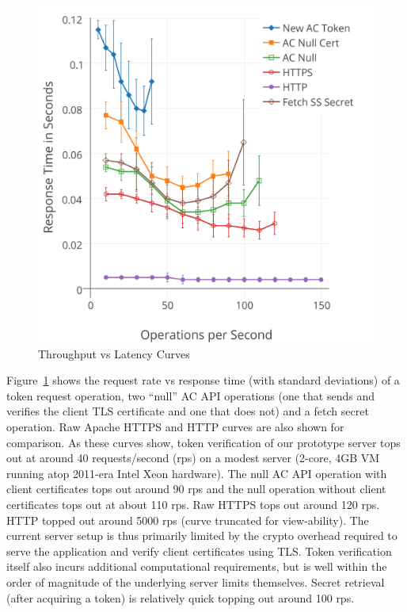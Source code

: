 \begin{figure}[th]
  \centering
  \includegraphics[width=\columnwidth]{./figs/png/chart-iops.png}
  \caption{Throughput vs Latency Curves}
  \label{fig:eval:iops}
\end{figure}

Figure~\ref{fig:eval:iops} shows the request rate vs response time
(with standard deviations) of a token request operation, two ``null''
AC API operations (one that sends and verifies the client TLS
certificate and one that does not) and a fetch secret operation. Raw
Apache HTTPS and HTTP curves are also shown for comparison. As these
curves show, token verification of our prototype server tops out at
around 40 requests/second (rps) on a modest server (2-core, 4GB VM
running atop 2011-era Intel Xeon hardware). The null AC API operation
with client certificates tops out around 90 rps and the null operation
without client certificates tops out at about 110 rps. Raw HTTPS tops
out around 120 rps. HTTP topped out around 5000 rps (curve truncated
for view-ability). The current server setup is thus primarily limited
by the crypto overhead required to serve the application and verify
client certificates using TLS. Token verification itself also incurs
additional computational requirements, but is well within the order of
magnitude of the underlying server limits themselves. Secret retrieval
(after acquiring a token) is relatively quick topping out around 100
rps.

